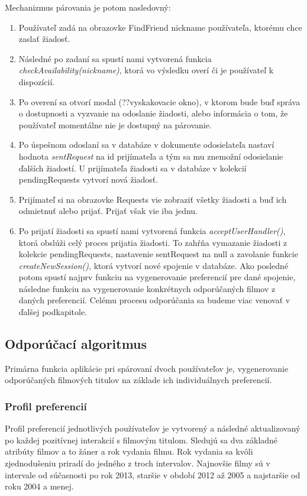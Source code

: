 Mechanizmus párovania je potom nasledovný:
\begin{enumerate}
    \item {Používateľ zadá na obrazovke FindFriend nickname používateľa, ktorému chce zaslať žiadosť.}
    \item {Následné po zadaní sa spustí nami vytvorená funkcia \textit{checkAvailability(nickname)}, ktorá vo výsledku overí či je používateľ k dispozícií.}
    \item {Po overení sa otvorí modal (??vyskakovacie okno), v ktorom bude buď správa o dostupnosti a vyzvanie na odoslanie žiadosti, alebo informácia o tom, že používateľ momentálne nie je dostupný na párovanie.}
    \item {Po úspešnom odoslaní sa v databáze v dokumente odosielateľa nastaví hodnota \textit{sentRequest} na id prijímateľa a tým sa mu znemožní odosielanie ďalších žiadostí. U prijímateľa žiadosti sa v databáze v kolekcií pendingRequests vytvorí nová žiadosť.}
    \item {Prijímateľ si na obrazovke Requests vie zobraziť všetky žiadosti a buď ich odmietnuť alebo prijať. Prijať však vie iba jednu.}
    \item {Po prijatí žiadosti sa spustí nami vytvorená funkcia \textit{acceptUserHandler()}, ktorá obslúži celý proces prijatia žiadosti. To zahŕňa vymazanie žiadosti z kolekcie pendingRequests, nastavenie sentRequest na null a zavolanie funkcie \textit{createNewSession()}, ktorá vytvorí nové spojenie v databáze. Ako posledné potom spustí najprv funkciu na vygenerovanie preferencií pre dané spojenie, následne funkciu na vygenerovanie konkrétnych odporúčaných filmov z daných preferencií. Celému procesu odporúčania sa budeme viac venovať v ďalšej podkapitole.}
\end{enumerate}

\subsection{Odporúčací algoritmus}
Primárna funkcia aplikácie pri spárovaní dvoch používateľov je, vygenerovanie odporúčaných filmových titulov na základe ich individuálnych preferencií.  
\subsubsection{Profil preferencií}
Profil preferencií jednotlivých používateľov je vytvorený a následné aktualizovaný po každej pozitívnej interakcií s filmovým titulom. Sledujú sa dva základné atribúty filmov a to žáner a rok vydania filmu. Rok vydania sa kvôli zjednodušeniu priradí do jedného z troch intervalov. Najnovšie filmy sú v intervale od súčasnosti po rok 2013, staršie v období 2012 až 2005 a najstaršie od roku 2004 a menej.

